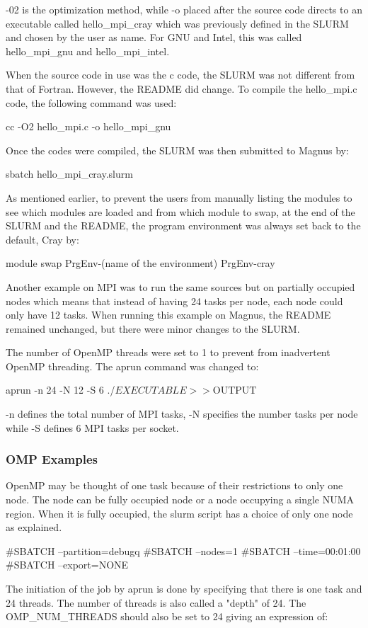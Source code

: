 \documentclass[journal]{IEEEtran}
\begin{document}
-02 is the optimization method, while -o placed after the source code directs to an executable called hello_mpi_cray which was previously defined in the
SLURM and chosen by the user as name. For GNU and Intel, this was called hello_mpi_gnu and hello_mpi_intel. 

When the source code in use was the c code, the SLURM was not different from that of Fortran. However, the README did change. To compile the hello_mpi.c 
code, the following command was used: 

cc -O2 hello_mpi.c -o hello_mpi_gnu

Once the codes were compiled, the SLURM was then submitted to Magnus by:

sbatch hello_mpi_cray.slurm 

As mentioned earlier, to prevent the users from manually listing the modules to see which modules are loaded and from which module to swap, at the end
of the SLURM and the README, the program environment was always set back to the default, Cray by:

module swap PrgEnv-(name of the environment) PrgEnv-cray

Another example on MPI was to run the same sources but on partially occupied nodes which means that instead of having 24 tasks per node, each node could
only have 12 tasks. When running this example on Magnus, the README remained unchanged, but there were minor changes to the SLURM.

The number of OpenMP threads were set to 1 to prevent from inadvertent OpenMP threading. The aprun command was changed to:

aprun -n 24 -N 12 -S 6 ./$EXECUTABLE >> ${OUTPUT}

-n defines the total number of MPI tasks, -N specifies the number tasks per node while -S defines 6 MPI tasks per socket.

\subsubsection{OMP Examples}

OpenMP may be thought of one task because of their restrictions to only one node.
The node can be fully occupied node or a node occupying a single NUMA region.
When it is fully occupied, the slurm script has a choice of only one node as explained.

#SBATCH --partition=debugq
#SBATCH --nodes=1
#SBATCH --time=00:01:00
#SBATCH --export=NONE

The initiation of the job by aprun is done by specifying that there is one task and 24 threads. 
The number of threads is also called a "depth" of 24.
The OMP_NUM_THREADS should also be set to 24 giving an expression of:
\end{document}
